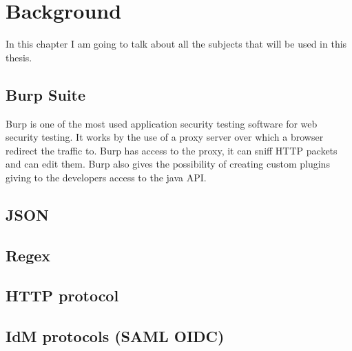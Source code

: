 \printglossary

\chapter{Background}
In this chapter I am going to talk about all the subjects that will be used in this thesis.

\section{Burp Suite}
Burp is one of the most used application security testing software for web security testing. It works by the use of a proxy server over which a browser redirect the traffic to. Burp has access to the proxy, it can sniff HTTP packets and can edit them. Burp also gives the possibility of creating custom plugins giving to the developers access to the java API.

\section{JSON}


\section{Regex}


\section{HTTP protocol}

\section{IdM protocols (SAML OIDC)}




